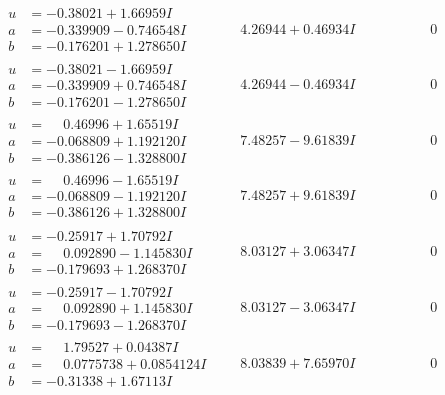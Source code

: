 \documentclass[1p]{elsarticle_modified}
\theoremstyle{definition}
\begin{document}
$$\begin{array}{c|c|c}
\begin{aligned}
u &= -0.38021 + 1.66959 I \\
a &= -0.339909 - 0.746548 I \\
b &= -0.176201 + 1.278650 I\end{aligned}
 & \phantom{-}4.26944 + 0.46934 I & \phantom{-0.000000 } 0 \\ \hline\begin{aligned}
u &= -0.38021 - 1.66959 I \\
a &= -0.339909 + 0.746548 I \\
b &= -0.176201 - 1.278650 I\end{aligned}
 & \phantom{-}4.26944 - 0.46934 I & \phantom{-0.000000 } 0 \\ \hline\begin{aligned}
u &= \phantom{-}0.46996 + 1.65519 I \\
a &= -0.068809 + 1.192120 I \\
b &= -0.386126 - 1.328800 I\end{aligned}
 & \phantom{-}7.48257 - 9.61839 I & \phantom{-0.000000 } 0 \\ \hline\begin{aligned}
u &= \phantom{-}0.46996 - 1.65519 I \\
a &= -0.068809 - 1.192120 I \\
b &= -0.386126 + 1.328800 I\end{aligned}
 & \phantom{-}7.48257 + 9.61839 I & \phantom{-0.000000 } 0 \\ \hline\begin{aligned}
u &= -0.25917 + 1.70792 I \\
a &= \phantom{-}0.092890 - 1.145830 I \\
b &= -0.179693 + 1.268370 I\end{aligned}
 & \phantom{-}8.03127 + 3.06347 I & \phantom{-0.000000 } 0 \\ \hline\begin{aligned}
u &= -0.25917 - 1.70792 I \\
a &= \phantom{-}0.092890 + 1.145830 I \\
b &= -0.179693 - 1.268370 I\end{aligned}
 & \phantom{-}8.03127 - 3.06347 I & \phantom{-0.000000 } 0 \\ \hline\begin{aligned}
u &= \phantom{-}1.79527 + 0.04387 I \\
a &= \phantom{-}0.0775738 + 0.0854124 I \\
b &= -0.31338 + 1.67113 I\end{aligned}
 & \phantom{-}8.03839 + 7.65970 I & \phantom{-0.000000 } 0 \\ \hline\begin{aligned}

\end{aligned}
\end{array}$$
\end{document}
